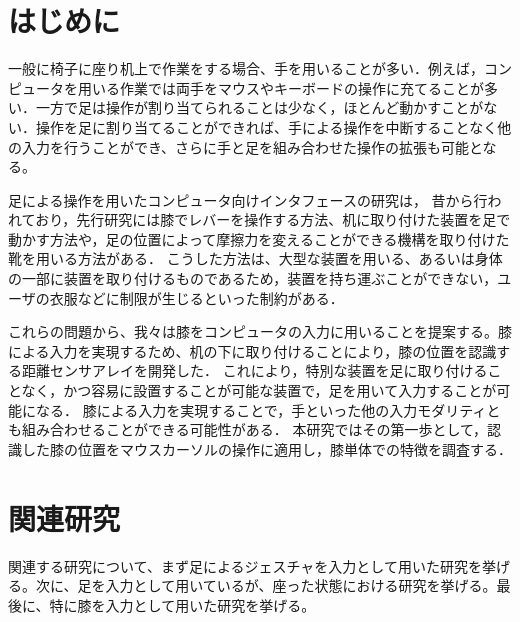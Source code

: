 \documentclass[submit, techrep]{ipsj}
\begin{document}
\section{はじめに}
一般に椅子に座り机上で作業をする場合、手を用いることが多い．例えば，コンピュータを用いる作業では両手をマウスやキーボードの操作に充てることが多い．一方で足は操作が割り当てられることは少なく，ほとんど動かすことがない．操作を足に割り当てることができれば、手による操作を中断することなく他の入力を行うことができ、さらに手と足を組み合わせた操作の拡張も可能となる。\par
足による操作を用いたコンピュータ向けインタフェースの研究は，
昔から行われており，先行研究には膝でレバーを操作する方法\cite{1698228}、机に取り付けた装置を足で動かす方法\cite{Pearson:1986:MMD:22627.22392, Pearson:1988:EEP:57167.57169}や，足の位置によって摩擦力を変えることができる機構を取り付けた靴\cite{Horodniczy:2017:FHE:3025453.3025625}を用いる方法がある．
こうした方法は、大型な装置を用いる、あるいは身体の一部に装置を取り付けるものであるため，装置を持ち運ぶことができない，ユーザの衣服などに制限が生じるといった制約がある．\par
これらの問題から、我々は膝をコンピュータの入力に用いることを提案する。膝による入力を実現するため、机の下に取り付けることにより，膝の位置を認識する距離センサアレイを開発した．
これにより，特別な装置を足に取り付けることなく，かつ容易に設置することが可能な装置で，足を用いて入力することが可能になる．
膝による入力を実現することで，手といった他の入力モダリティとも組み合わせることができる可能性がある．
本研究ではその第一歩として，認識した膝の位置をマウスカーソルの操作に適用し，膝単体での特徴を調査する．



\section{関連研究}
関連する研究について、まず足によるジェスチャを入力として用いた研究を挙げる。次に、足を入力として用いているが、座った状態における研究を挙げる。最後に、特に膝を入力として用いた研究を挙げる。
\end{document}
